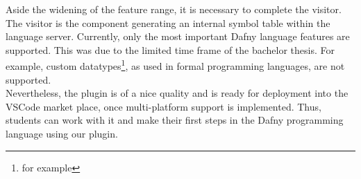 Aside the widening of the feature range, it is necessary to complete the visitor.
The visitor is the component generating an internal symbol table within the language server.
Currently, only the most important Dafny language features are supported.
This was due to the limited time frame of the bachelor thesis.
For example, custom datatypes\footnote{for example }, as used in formal programming languages, are not supported.\\

Nevertheless, the plugin is of a nice quality and is ready for deployment into the VSCode market place, once multi-platform support is implemented.
Thus, students can work with it and make their first steps in the Dafny programming language using our plugin.
